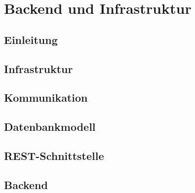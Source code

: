 
\section{Backend und Infrastruktur}
\subsection{Einleitung}
\subsection{Infrastruktur}
\subsection{Kommunikation}
\subsection{Datenbankmodell}
\subsection{REST-Schnittstelle}
\subsection{Backend}
